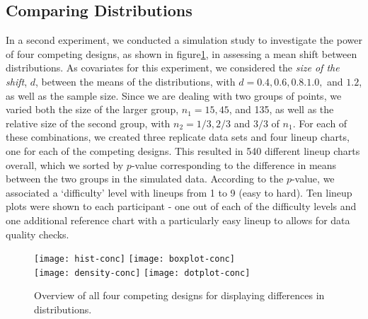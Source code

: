 
\subsection{Comparing Distributions}

In a second experiment, we conducted a simulation study to investigate the power of four competing designs, as shown in figure\ref{fig:expii}, in assessing a mean shift between distributions. As covariates for this experiment, we considered the {\it size of the shift}, $d$, between the means of the distributions, with $d=0.4, 0.6, 0.8. 1.0,$ and $1.2$, as well as the sample size.  Since we are dealing with two groups of points, we varied both the size of the larger group, $n_1 = 15, 45$, and 135, as well as the relative size of the second group, with $n_2 = 1/3, 2/3$ and $3/3$ of $n_1$. For each of these combinations, we created three replicate data sets and four lineup charts, one for each of the competing designs. This resulted in 540 different lineup charts overall, which we sorted by $p$-value corresponding to the difference in means between the two groups in the simulated data. According to the $p$-value, we associated a `difficulty' level with lineups from 1 to 9 (easy to hard). Ten lineup plots were shown to each participant - one out of each of the difficulty levels and one additional reference chart with a particularly easy lineup  to allows for data quality checks.
\begin{figure} [hbtp]
   \centering
   \texttt{[image: hist-conc]} 
   \texttt{[image: boxplot-conc]} \\
   \texttt{[image: density-conc]} 
   \texttt{[image: dotplot-conc]} 
   \caption{Overview of all four competing designs for displaying differences in distributions.}
   \label{fig:expii}
\end{figure}